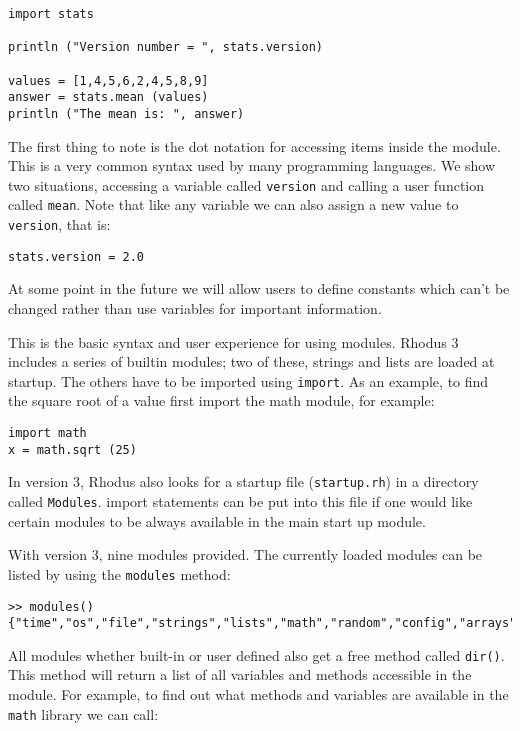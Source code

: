 \begin{lstlisting}
import stats

println ("Version number = ", stats.version)

values = [1,4,5,6,2,4,5,8,9]
answer = stats.mean (values)
println ("The mean is: ", answer)
\end{lstlisting}

The first thing to note is the dot notation for accessing items inside the module. This is a very common syntax used by many programming languages. We show two situations, accessing a variable called {\tt version} and calling a user function called {\tt mean}. Note that like any variable we can also assign a new value to {\tt version}, that is:

\begin{lstlisting}
stats.version = 2.0
\end{lstlisting}

At some point in the future we will allow users to define constants which can't be changed rather than use variables for important information.

This is the basic syntax and user experience for using modules. Rhodus 3 includes a series of builtin modules; two of these, strings and lists are loaded at startup. The others have to be imported using {\tt import}. As an example, to find the square root of a value first import the math module, for example:

\begin{lstlisting}
import math
x = math.sqrt (25)
\end{lstlisting}

In version 3, Rhodus also looks for a startup file ({\tt startup.rh}) in a directory called {\tt Modules}. import statements can be put into this file if one would like certain modules to be always available in the main start up module.

With version 3, nine modules provided. The currently loaded modules can be listed by using the {\tt modules{}} method:

\begin{lstlisting}
>> modules()
{"time","os","file","strings","lists","math","random","config","arrays"}
\end{lstlisting}

All modules whether built-in or user defined also get a free method called {\tt dir()}. This method will return a list of all variables and methods accessible in the module. For example, to find out what methods and variables are available in the {\tt math} library we can call:

